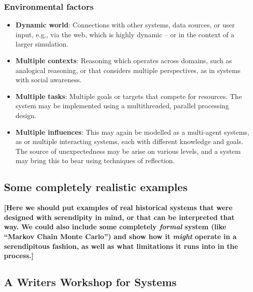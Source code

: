 \subsubsection*{Environmental factors}

\begin{itemize}
\item \textbf{Dynamic world}: Connections with other systems, data
  sources, or user input, e.g., via the web, which is highly dynamic --
  or in the context of a larger simulation.
\item \textbf{Multiple contexts}: Reasoning which operates across
  domains, such as analogical reasoning, or that considers multiple
  perspectives, as in systems with social awareness.
\item \textbf{Multiple tasks}: Multiple goals or targets that compete
  for resources.  The system may be implemented using a multithreaded,
  parallel processing design.
\item \textbf{Multiple influences}: This may again be modelled as a
  multi-agent systems, as or multiple interacting systems, each with
  different knowledge and goals.  The source of unexpectedness may be
  arise on various levels, and a system may bring this to bear using
  techniques of reflection.
\end{itemize}

% 

\subsection{Some completely realistic examples}

\textbf{[Here we should put examples of real historical systems that
    were designed with serendipity in mind, or that can be interpreted
    that way.  We could also include some completely \emph{formal}
    system (like ``Markov Chain Monte Carlo'') and show how it
    \emph{might} operate in a serendipitous fashion, as well as what
    limitations it runs into in the process.]}

\subsection{A Writers Workshop for Systems} \label{sec:ww}


